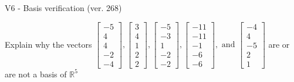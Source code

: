 \begin{exercise}
  \begin{exerciseTitle}V6 - Basis verification (ver. 268)\end{exerciseTitle}
  \begin{exerciseStatement}
    Explain why the vectors \(\left[\begin{array}{r}
-5 \\
4 \\
4 \\
-2 \\
-4
\end{array}\right] , \left[\begin{array}{r}
3 \\
4 \\
1 \\
2 \\
2
\end{array}\right] , \left[\begin{array}{r}
-5 \\
-3 \\
1 \\
-2 \\
-2
\end{array}\right] , \left[\begin{array}{r}
-11 \\
-11 \\
-1 \\
-6 \\
-6
\end{array}\right] , \text{ and } \left[\begin{array}{r}
-4 \\
4 \\
-5 \\
2 \\
1
\end{array}\right]\) are or are not a basis of \(\mathbb{R}^5\)	



\end{exerciseStatement}
\end{exercise}
